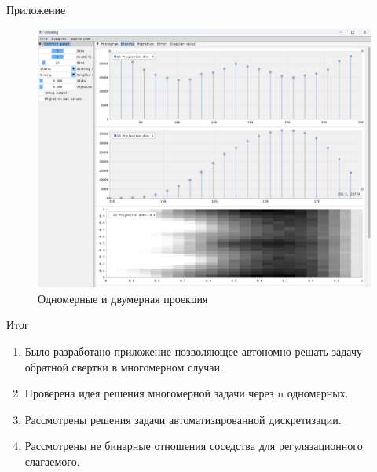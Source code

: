 \documentclass[fullscreen=true,russian,compress,%
	hyperref={unicode,bookmarks=false}]{presentation}
\begin{document}
\begin{frame}{Приложение}
   \begin{figure}[h!]
      \centering
      \includegraphics[scale=0.3]{images/binning_projections_example.png}
      \caption{Одномерные и двумерная проекция}
   \end{figure}
\end{frame}

\begin{frame}{Итог}
   \begin{enumerate}
      \item Было разработано приложение позволяющее автономно решать задачу обратной свертки в многомерном случаи.
      \item Проверена идея решения многомерной задачи через n одномерных.
      \item Рассмотрены решения задачи автоматизированной дискретизации.
      \item Рассмотрены не бинарные отношения соседства для регулязационного слагаемого.
   \end{enumerate}
\end{frame}
\end{document}
